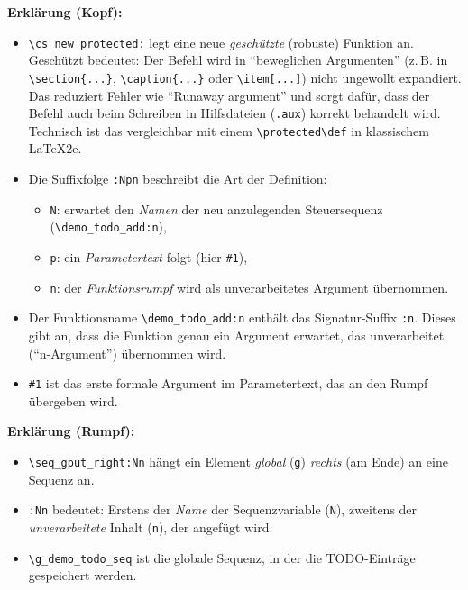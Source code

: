 \documentclass[11pt,a4paper]{book}
\begin{document}
\begin{description}
\textbf{Erklärung (Kopf):}
\begin{itemize}
  \item \verb|\cs_new_protected:| legt eine neue \emph{geschützte} (robuste) Funktion an.  
        Geschützt bedeutet: Der Befehl wird in \enquote{beweglichen Argumenten} (z.\,B. in \verb|\section{...}|, \verb|\caption{...}| oder \verb|\item[...]|) nicht ungewollt expandiert.  
        Das reduziert Fehler wie \enquote{Runaway argument} und sorgt dafür, dass der Befehl auch beim Schreiben in Hilfsdateien (\texttt{.aux}) korrekt behandelt wird.  
        Technisch ist das vergleichbar mit einem \verb|\protected\def| in klassischem \LaTeX2e.
  \item Die Suffixfolge \verb|:Npn| beschreibt die Art der Definition:
    \begin{itemize}
      \item \texttt{N}: erwartet den \emph{Namen} der neu anzulegenden Steuersequenz (\verb|\demo_todo_add:n|),
      \item \texttt{p}: ein \emph{Parametertext} folgt (hier \verb|#1|),
      \item \texttt{n}: der \emph{Funktionsrumpf} wird als unverarbeitetes Argument übernommen.
    \end{itemize}
  \item Der Funktionsname \verb|\demo_todo_add:n| enthält das Signatur-Suffix \texttt{:n}.  
        Dieses gibt an, dass die Funktion genau ein Argument erwartet, das unverarbeitet (\enquote{n-Argument}) übernommen wird.
  \item \verb|#1| ist das erste formale Argument im Parametertext, das an den Rumpf übergeben wird.
\end{itemize}

\textbf{Erklärung (Rumpf):}
\begin{itemize}
  \item \verb|\seq_gput_right:Nn| hängt ein Element \emph{global} (\texttt{g}) \emph{rechts} (am Ende) an eine Sequenz an.
  \item \texttt{:Nn} bedeutet: Erstens der \emph{Name} der Sequenzvariable (\texttt{N}), zweitens der \emph{unverarbeitete} Inhalt (\texttt{n}), der angefügt wird.
  \item \verb|\g_demo_todo_seq| ist die globale Sequenz, in der die TODO-Einträge gespeichert werden.
\end{itemize}


\end{description}
\end{document}
